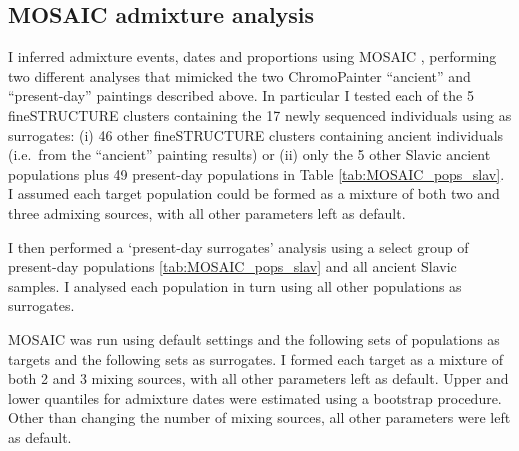 \subsection{MOSAIC admixture analysis}

I inferred admixture events, dates and proportions using  MOSAIC \cite{MOSAIC_2019}, performing two different analyses that mimicked the two ChromoPainter ``ancient'' and ``present-day'' paintings described above. In particular I tested each of the 5 fineSTRUCTURE clusters containing the 17 newly sequenced individuals using as surrogates: (i) 46 other fineSTRUCTURE clusters containing ancient individuals (i.e.\ from the ``ancient'' painting results) or (ii) only the 5 other Slavic ancient populations plus 49 present-day populations in Table \ref{tab:MOSAIC_pops_slav}. I assumed each target population could be formed as a mixture of both two and three admixing sources, with all other parameters left as default. 

I then performed a `present-day surrogates' analysis using a select group of present-day populations \ref{tab:MOSAIC_pops_slav} and all ancient Slavic samples. I analysed each population in turn using all other populations as surrogates.  

MOSAIC was run using default settings and the following sets of populations as targets and the following sets as surrogates. I formed each target as a mixture of both 2 and 3 mixing sources, with all other parameters left as default. Upper and lower quantiles for admixture dates were estimated using a bootstrap procedure. Other than changing the number of mixing sources, all other parameters were left as default.


